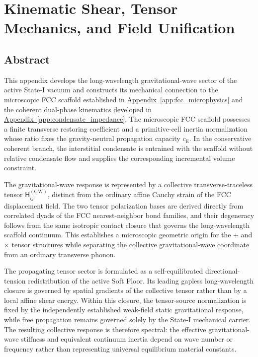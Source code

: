 \chapter{Kinematic Shear, Tensor Mechanics, and Field Unification}
\label{app:kinematic_shear}

\section*{Abstract}
This appendix develops the long-wavelength gravitational-wave sector of the active State-I vacuum and constructs its mechanical connection to the microscopic FCC scaffold established in \hyperref[app:fcc_microphysics]{Appendix~\ref*{app:fcc_microphysics}} and the coherent dual-phase kinematics developed in \hyperref[app:condensate_impedance]{Appendix~\ref*{app:condensate_impedance}}. The microscopic FCC scaffold possesses a finite transverse restoring coefficient and a primitive-cell inertia normalization whose ratio fixes the gravity-neutral propagation capacity $c_{\mathrm{E}}$. In the conservative coherent branch, the interstitial condensate is entrained with the scaffold without relative condensate flow and supplies the corresponding incremental volume constraint.

The gravitational-wave response is represented by a collective transverse-traceless tensor $\mathsf{H}_{ij}^{(\mathrm{GW})}$, distinct from the ordinary affine Cauchy strain of the FCC displacement field. The two tensor polarization bases are derived directly from correlated dyads of the FCC nearest-neighbor bond families, and their degeneracy follows from the same isotropic contact closure that governs the long-wavelength scaffold continuum. This establishes a microscopic geometric origin for the $+$ and $\times$ tensor structures while separating the collective gravitational-wave coordinate from an ordinary transverse phonon.

The propagating tensor sector is formulated as a self-equilibrated directional-tension redistribution of the active Soft Floor. Its leading gapless long-wavelength closure is governed by spatial gradients of the collective tensor rather than by a local affine shear energy. Within this closure, the tensor-source normalization is fixed by the independently established weak-field static gravitational response, while free propagation remains governed solely by the State-I mechanical carrier. The resulting collective response is therefore spectral: the effective gravitational-wave stiffness and equivalent continuum inertia depend on wave number or frequency rather than representing universal equilibrium material constants.

